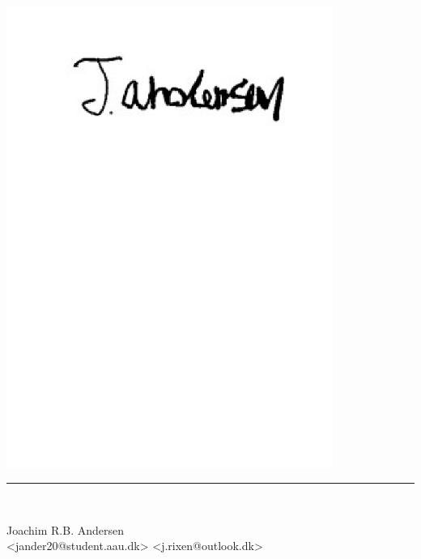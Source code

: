 \begin{minipage}[b]{0.45\textwidth}
 \centering
 {
 \includegraphics[clip, trim=0 600 0 0, width=0.8\textwidth]{Formalia/Figures/Jsig.pdf}
 \rule{\textwidth}{0.5pt}\\}
 Joachim R.B. Andersen\\
 {\footnotesize <jander20@student.aau.dk>}
 {\footnotesize <j.rixen@outlook.dk>}
\end{minipage}
\hfill
\vspace{5pt}
